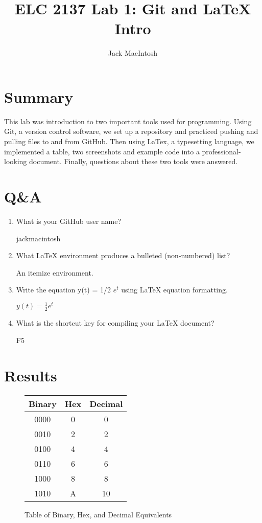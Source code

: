 \documentclass[11pt]{article}
\begin{document}
\title{ELC 2137 Lab 1: Git and LaTeX Intro}
\author{Jack MacIntosh}

\maketitle


\section*{Summary}

This lab was introduction to two important tools used for programming. Using Git, a version control software, we set up a repository and practiced pushing and pulling files to and from GitHub. Then using LaTex, a typesetting language, we implemented a table, two screenshots and example code into a professional-looking document. Finally, questions about these two tools were answered.


\section*{Q\&A}

\begin{enumerate}
	\item What is your GitHub user name?
	
	jackmacintosh
	
	\item What LaTeX environment produces a bulleted (non-numbered) list?
	
	An itemize environment.
	
	\item Write the equation y(t) = 1/2 $e^t$ using LaTeX equation formatting.
	
 	$y(t) = \frac{1}{2}e^t$
 	
 	\item What is the shortcut key for compiling your LaTeX document?
 	
 	F5
\end{enumerate}


\section*{Results}

\begin{figure}[ht]\centering
	\begin{center}
		\begin{tabular}{c|c|c}
			Binary & Hex & Decimal \\
			\toprule
			0000 & 0 & 0 \\
			0010 & 2 & 2 \\
			0100 & 4 & 4 \\
			0110 & 6 & 6 \\
			1000 & 8 & 8 \\
			1010 & A & 10 \\
			\bottomrule
		
		\end{tabular} 
		\caption{Table of Binary, Hex, and Decimal Equivalents}
	\end{center}
\end{figure}
\end{document}
